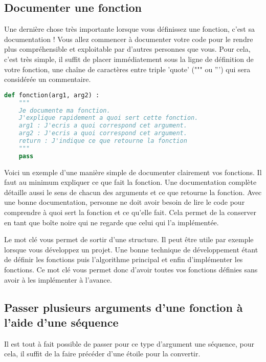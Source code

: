 \documentclass[a4paper,twoside]{article}
\begin{document}
\subsection{Documenter une fonction}

Une dernière chose très importante lorsque vous définissez une fonction, c'est sa documentation ! Vous allez commencer à documenter votre code pour le rendre plus compréhensible et exploitable par d'autres personnes que vous. Pour cela, c'est très simple, il suffit de placer immédiatement sous la ligne de définition de votre fonction, une chaîne de caractères entre triple 'quote' (""" ou ''') qui sera considérée un commentaire.

\begin{lstlisting}[language=python]
def fonction(arg1, arg2) :
    """
    Je documente ma fonction. 
    J'explique rapidement a quoi sert cette fonction.
    arg1 : J'ecris a quoi correspond cet argument.
    arg2 : J'ecris a quoi correspond cet argument.
    return : J'indique ce que retourne la fonction
    """
    pass
\end{lstlisting}

Voici un exemple d'une manière simple de documenter clairement vos fonctions. Il faut au minimum expliquer ce que fait la fonction. Une documentation complète détaille aussi le sens de chacun des arguments et ce que retourne la fonction. Avec une bonne documentation, personne ne doit avoir besoin de lire le code pour comprendre à quoi sert la fonction et ce qu'elle fait. Cela permet de la conserver en tant que boîte noire qui ne regarde que celui qui l'a implémentée.

\begin{remarque}
Le mot clé  vous permet de sortir d'une structure. Il peut être utile par exemple lorsque vous développez un projet. Une bonne technique de développement étant de définir les fonctions puis l'algorithme principal et enfin d'implémenter les fonctions. Ce mot clé vous permet donc d'avoir toutes vos fonctions définies sans avoir à les implémenter à l'avance.
\end{remarque}

\subsection{Passer plusieurs arguments d'une fonction à l'aide d'une séquence}\label{sec:args_liste}
Il est tout à fait possible de passer pour ce type d'argument une séquence, pour cela, il suffit de la faire précéder d'une étoile pour la convertir.
\end{document}
